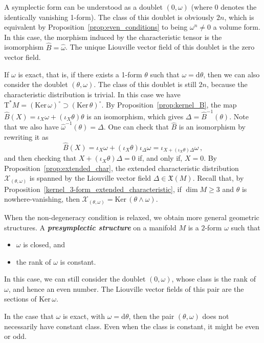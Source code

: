 \documentclass[11pt,twoside]{article}
\theoremstyle{plain}
\theoremstyle{definition}
\renewcommand{\d}{\mathrm{d}}
\newcommand{\T}{{\mathrm T}}
\let\Tan\T
\newcommand*{\inn}[1]{\iota_{#1}}
\newcommand{\X}{\mathfrak{X}}
\def\d{\mathrm{d}}
\newcommand\dfn[1]{{\textbf{\emph{#1}}}}
\def\X{\mathfrak{X}}
\def\d{\mathrm{d}}
\def\Ker{\mathrm{Ker \,}}
\def\Tan{\mathrm{T}}
\begin{document}
A symplectic form can be understood as a doublet $(0,\omega)$ 
(where $0$ denotes the identically vanishing 1-form). 
The class of this doublet is obviously $2n$,
which is equivalent by Proposition~\ref{prop:even_conditions} to 
being $\omega^n\neq 0$ a volume form.  
In this case, 
the morphism induced by the characteristic tensor is the isomorphism 
$\widehat B = \widehat \omega$. 
The unique Liouville vector field of this doublet is the zero vector field.

If $\omega$ is exact, that is, if there exists a 1-form $\theta$ such that $\omega = \d \theta$, 
then we can also consider the doublet $(\theta, \omega)$. 
The class of this doublet is still $2n$, because the characteristic distribution is trivial. 
In this case we have 
$\Tan^* M =(\Ker \omega)^{\circ} \supset (\Ker \theta)^{\circ}$.
By Proposition~\ref{prop:kernel_B}, 
the map $\widehat B(X) = \inn{X} \omega + (\inn{X} \theta)\theta$ 
is an isomorphism, which gives $\Delta=\widehat B^{-1}(\theta)$. 
Note that we also have $\widehat \omega^{-1} (\theta) = \Delta$. 
One can check that $\widehat B$ is an isomorphism by rewriting it as
$$\widehat B(X) = \inn{X}\omega +(\inn{X} \theta)\inn{\Delta}\omega = \inn{X + (\inn{X} \theta)\Delta} \omega\,,$$
and then checking that $X+(\inn{X}\theta)\Delta = 0$ if, and only if, $X=0$. By Proposition~\ref{prop:extended_char}, the extended characteristic distribution $\mathcal{X}_{(\theta,\omega)}$ is spanned by the Liouville vector field $\Delta \in \X(M)$. 
Recall that, by Proposition~\ref{kernel_3-form_extended_characteristic}, if $\dim M \geq 3$ and $\theta$ is nowhere-vanishing, then $\mathcal{X}_{(\theta,\omega)} = \Ker (\theta\wedge \omega)$.


When the non-degeneracy condition is relaxed, we obtain more general geometric structures.
A \dfn{presymplectic structure} on a manifold $M$ is a $2$-form $\omega$ such that
\begin{itemize}
    \item $\omega$ is closed, and
    \item the rank of $\omega$ is constant.
\end{itemize}
In this case, we can still consider the doublet $(0,\omega)$, 
whose class is the rank of $\omega$, and hence an even number. 
The Liouville vector fields of this pair are the sections of $\Ker \omega$.

In the case that $\omega$ is exact, with $\omega = \d \theta$, 
then the pair $(\theta,\omega)$ does not necessarily have constant class. 
Even when the class is constant, it might be even or odd.  
\end{document}
